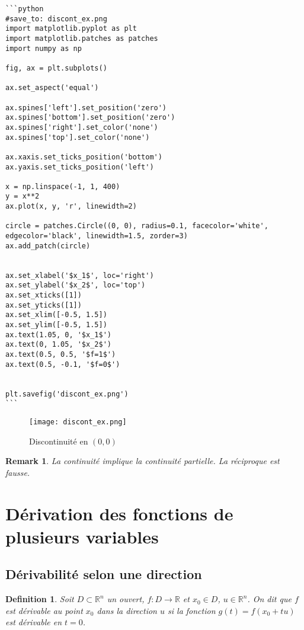 \documentclass{article}
\newtheorem{definition}{Definition}
\newtheorem{remark}{Remark}
\begin{document}
\begin{verbatim}
```python
#save_to: discont_ex.png
import matplotlib.pyplot as plt
import matplotlib.patches as patches
import numpy as np

fig, ax = plt.subplots()

ax.set_aspect('equal')

ax.spines['left'].set_position('zero')
ax.spines['bottom'].set_position('zero')
ax.spines['right'].set_color('none')
ax.spines['top'].set_color('none')

ax.xaxis.set_ticks_position('bottom')
ax.yaxis.set_ticks_position('left')

x = np.linspace(-1, 1, 400)
y = x**2
ax.plot(x, y, 'r', linewidth=2)

circle = patches.Circle((0, 0), radius=0.1, facecolor='white', edgecolor='black', linewidth=1.5, zorder=3)
ax.add_patch(circle)


ax.set_xlabel('$x_1$', loc='right')
ax.set_ylabel('$x_2$', loc='top')
ax.set_xticks([1])
ax.set_yticks([1])
ax.set_xlim([-0.5, 1.5])
ax.set_ylim([-0.5, 1.5])
ax.text(1.05, 0, '$x_1$')
ax.text(0, 1.05, '$x_2$')
ax.text(0.5, 0.5, '$f=1$')
ax.text(0.5, -0.1, '$f=0$')


plt.savefig('discont_ex.png')
```
\end{verbatim}

\begin{figure}[h]
\centering
\texttt{[image: discont\_ex.png]}
\caption{Discontinuité en $(0,0)$}
\label{fig:discont_ex}
\end{figure}


\begin{remark}
La continuité implique la continuité partielle. La réciproque est fausse.
\end{remark}

\section{Dérivation des fonctions de plusieurs variables}

\subsection{Dérivabilité selon une direction}

\begin{definition}
Soit $D \subset \mathbb{R}^n$ un ouvert, $f: D \rightarrow \mathbb{R}$ et $x_0 \in D$, $u \in \mathbb{R}^n$. On dit que $f$ est dérivable au point $x_0$ dans la direction $u$ si la fonction $g(t) = f(x_0 + tu)$ est dérivable en $t = 0$.
\end{definition}
\end{document}
